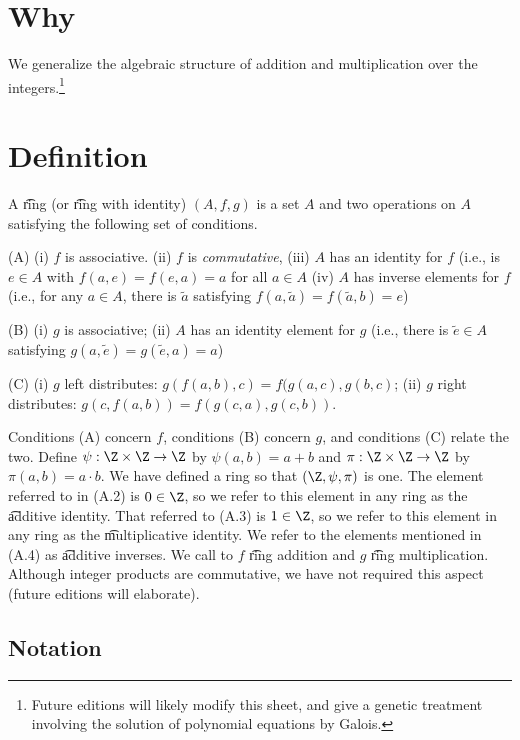 
\section*{Why}

We generalize the algebraic structure of addition and multiplication over the integers.\footnote{Future editions will likely modify this sheet, and give a genetic treatment involving the solution of polynomial equations by Galois.}

\section*{Definition}

A \t{ring} (or \t{ring with identity}) $(A, f, g)$ is a set $A$ and two operations on $A$ satisfying the following set of conditions.

(A)
(i) $f$ is associative.
(ii) $f$ is \textit{commutative},
(iii) $A$ has an identity for $f$ (i.e., is $e \in A$ with $f(a, e) = f(e, a) = a$ for all $a \in A$
(iv) $A$ has inverse elements for $f$ (i.e., for any $a \in A$, there is $\tilde{a} $ satisfying $f(a,\tilde{a}) = f(\tilde{a}, b) = e$)

(B)
(i) $g$ is associative;
(ii) $A$ has an identity element for $g$ (i.e., there is $\tilde{e} \in A$ satisfying $g(a, \tilde{e}) = g(\tilde{e},a) = a$)

(C)
(i) $g$ left distributes: $g(f(a, b), c) = f(g(a,c), g(b,c)$;
(ii) $g$ right distributes: $g(c,f(a,b)) = f(g(c,a), g(c,b))$.

Conditions (A) concern $f$, conditions (B) concern $g$, and conditions (C) relate the two.
Define $\psi : \Z  \times  \Z  \to \Z $ by $\psi (a, b) = a+b$ and $\pi : \Z  \times  \Z  \to \Z $ by $\pi(a, b) = a\cdot b$.
We have defined a ring so that $(\Z , \psi , \pi )$ is one.
The element referred to in (A.2) is $0 \in \Z $, so we refer to this element in any ring as the \t{additive identity}.
That referred to (A.3) is $1 \in \Z $, so we refer to this element in any ring as the \t{multiplicative identity}.
We refer to the elements mentioned in (A.4) as \t{additive inverses}.
We call to $f$ \t{ring addition} and $g$ \t{ring multiplication}.
Although integer products are commutative, we have not required this aspect (future editions will elaborate).

\subsection*{Notation}

